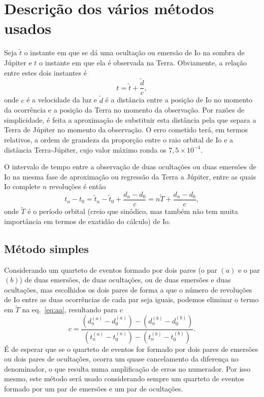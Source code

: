 \documentclass[]{article}
\begin{document}
\section{Descrição dos vários métodos usados}
Seja $\tilde t$ o instante em que se dá uma ocultação ou emersão de Io na sombra
de Júpiter e $t$ o instante em que ela é observada na Terra. Obviamente, a
relação entre estes dois instantes é
\begin{equation}
  t=\tilde t+\frac{\tilde d}{c},
\end{equation}
onde $c$ é a velocidade da luz e $\tilde d$ é a distância entre a posição de Io no
momento da ocorrência e a posição da Terra no momento da observação. Por razões
de simplicidade, é feita a aproximação de substituir esta distância pela que
separa a Terra de Júpiter no momento da observação. O erro cometido terá, em
termos relativos, a ordem de grandeza da proporção entre o raio orbital de Io e
a distância Terra-Júpiter, cujo valor máximo ronda os $7,5\times10^{-4}$.

O intervalo de tempo entre a observação de duas ocultações ou duas emersões de
Io na mesma fase de aproximação ou regressão da Terra a Júpiter, entre as quais
Io complete $n$ revoluções é então
\begin{equation}\label{eq:aa}
  t_n-t_0=\tilde t_n-\tilde t_0 + \frac{d_n-d_0}{c}=n\tilde T+
  \frac{d_n-d_0}{c},
\end{equation}
onde $\tilde T$ é o período orbital (creio que sinódico, mas também não tem
muita importância em termos de exatidão do cálculo) de Io.

\subsection{Método simples}
Considerando um quarteto de eventos formado por dois pares (o par $(a)$ e o par
$(b)$) de duas emersões, de
duas oculta\-ções, ou de duas emersões e duas ocultações, mas escolhidos os dois
pares de forma a que o número de revoluções de Io entre as duas ocorrências de
cada par seja iguais, podemos eliminar o termo em $\tilde T$ na
eq.~\eqref{eq:aa}, resultando para $c$
\begin{equation}\label{eq:bb}
  c=\frac%
  {\left(d^{(a)}_n-d^{(a)}_0\right)-\left(d^{(b)}_n-d^{(b)}_0\right)}%
  {\left(t^{(a)}_n-t^{(a)}_0\right)-\left(t^{(b)}_n-t^{(b)}_0\right)}.
\end{equation}
 É de esperar que se o quarteto de eventos for formado por dois pares
de emersões ou dois pares de ocultações, ocorra um quase cancelamento da
diferença no denominador, o que resulta numa amplificação de erros no numerador.
Por isso mesmo, este método será usado considerando sempre um quarteto de
eventos formado por um par de emersões e um par de ocultações.
\end{document}
